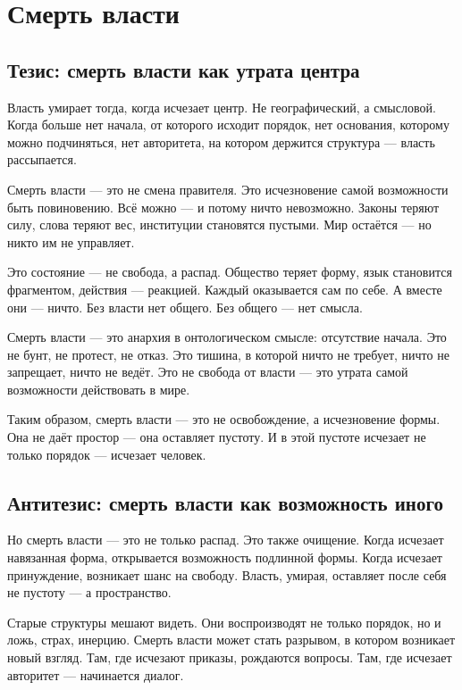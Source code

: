 \chapter{Смерть власти}

\section{Тезис: смерть власти как утрата центра}

Власть умирает тогда, когда исчезает центр. Не географический, а смысловой. Когда больше нет начала, от которого исходит порядок, нет основания, которому можно подчиняться, нет авторитета, на котором держится структура — власть рассыпается.

Смерть власти — это не смена правителя. Это исчезновение самой возможности быть повиновению. Всё можно — и потому ничто невозможно. Законы теряют силу, слова теряют вес, институции становятся пустыми. Мир остаётся — но никто им не управляет.

Это состояние — не свобода, а распад. Общество теряет форму, язык становится фрагментом, действия — реакцией. Каждый оказывается сам по себе. А вместе они — ничто. Без власти нет общего. Без общего — нет смысла.

Смерть власти — это анархия в онтологическом смысле: отсутствие начала. Это не бунт, не протест, не отказ. Это тишина, в которой ничто не требует, ничто не запрещает, ничто не ведёт. Это не свобода от власти — это утрата самой возможности действовать в мире.

Таким образом, смерть власти — это не освобождение, а исчезновение формы. Она не даёт простор — она оставляет пустоту. И в этой пустоте исчезает не только порядок — исчезает человек.

\section{Антитезис: смерть власти как возможность иного}

Но смерть власти — это не только распад. Это также очищение. Когда исчезает навязанная форма, открывается возможность подлинной формы. Когда исчезает принуждение, возникает шанс на свободу. Власть, умирая, оставляет после себя не пустоту — а пространство.

Старые структуры мешают видеть. Они воспроизводят не только порядок, но и ложь, страх, инерцию. Смерть власти может стать разрывом, в котором возникает новый взгляд. Там, где исчезают приказы, рождаются вопросы. Там, где исчезает авторитет — начинается диалог.

